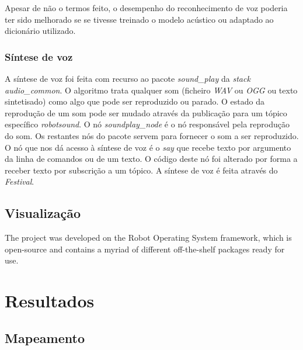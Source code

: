 \documentclass[journal]{IEEEtran}
\begin{document}
Apesar de não o termos feito, o desempenho do reconhecimento de voz poderia ter sido melhorado se se tivesse treinado o modelo acústico ou adaptado ao dicionário utilizado.


\subsubsection{Síntese de voz}

A síntese de voz foi feita com recurso ao pacote \textit{sound\_play} da \textit{stack} \textit{audio\_common}. O algoritmo trata qualquer som (ficheiro \emph{WAV} ou \emph{OGG} ou texto sintetisado) como algo que pode ser reproduzido ou parado. O estado da reprodução de um som pode ser mudado através da publicação para um tópico específico \textit{robotsound}. O nó \textit{soundplay\_node} é o nó responsável pela reprodução do som. Os restantes nós do pacote servem para fornecer o som a ser reproduzido. O nó que nos dá acesso à síntese de voz é o \textit{say} que recebe texto por argumento da linha de comandos ou de um texto. O código deste nó foi alterado por forma a receber texto por subscrição a um tópico. A síntese de voz é feita através do \emph{Festival}.


\subsection{Visualização}


The project was developed on the Robot Operating System framework, which is open-source and contains a myriad of different off-the-shelf packages ready for use.

\section{Resultados}

\subsection{Mapeamento}
\label{sec:results_mapping}
\end{document}
